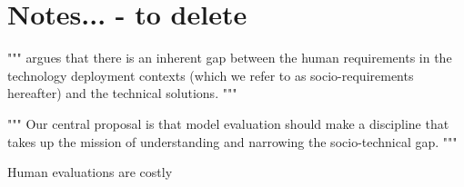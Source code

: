 







\section{Notes... - to delete}
"""
\cite{ackerman2000intellectual} argues that there is an inherent gap between the human
requirements in the technology deployment contexts (which we refer to as socio-requirements hereafter) and the technical solutions.
"""

"""
\cite{liao2023rethinking}
Our central proposal is that model evaluation should
make a discipline that takes up the mission of understanding
and narrowing the socio-technical gap.
"""


Human evaluations are costly 





